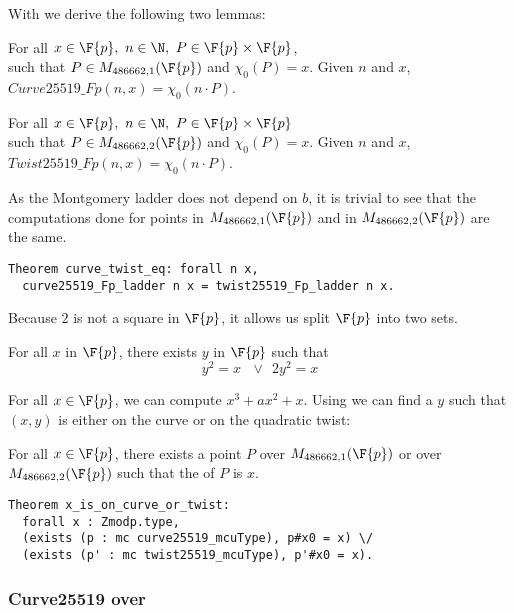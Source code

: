 With  we derive the following two lemmas:
\begin{lemma}
For all $x \in \F{p},\ n \in \N,\ P \in \F{p} \times \F{p}$,\\
such that $P \in M_{486662,1}(\F{p})$ and $\chi_0(P) = x$.
Given $n$ and $x$, $Curve25519\_Fp(n,x) = \chi_0(n \cdot P)$.
\end{lemma}
\begin{lemma}
For all $x \in \F{p},\ n \in \N,\ P \in \F{p} \times \F{p}$\\
such that $P \in M_{486662,2}(\F{p})$ and $\chi_0(P) = x$.
Given $n$ and $x$, $Twist25519\_Fp(n,x) = \chi_0(n \cdot P)$.
\end{lemma}
As the Montgomery ladder does not depend on $b$, it is trivial to
see that the computations done for points in $M_{486662,1}(\F{p})$ and in
$M_{486662,2}(\F{p})$ are the same.
\begin{lstlisting}[language=Coq]
Theorem curve_twist_eq: forall n x,
  curve25519_Fp_ladder n x = twist25519_Fp_ladder n x.
\end{lstlisting}

Because $2$ is not a square in $\F{p}$, it allows us split $\F{p}$ into two sets.
\begin{lemma}
  \label{lemma:square-or-2square}
  For all $x$ in $\F{p}$, there exists $y$ in $\F{p}$ such that
  $$y^2 = x\ \ \ \lor\ \ 2y^2 = x$$
\end{lemma}
For all $x \in \F{p}$, we can compute $x^3 + ax^2 + x$. Using 
we can find a $y$ such that $(x,y)$ is either on the curve or on the quadratic twist:
\begin{lemma}
  \label{lemma:curve-or-twist}
  For all $x \in \F{p}$, there exists a point $P$ over $M_{486662,1}(\F{p})$ or
  over $M_{486662,2}(\F{p})$ such that the \xcoord of $P$ is $x$.
\end{lemma}
\begin{lstlisting}[language=Coq]
Theorem x_is_on_curve_or_twist:
  forall x : Zmodp.type,
  (exists (p : mc curve25519_mcuType), p#x0 = x) \/
  (exists (p' : mc twist25519_mcuType), p'#x0 = x).
\end{lstlisting}

\subsubsection{Curve25519 over }

